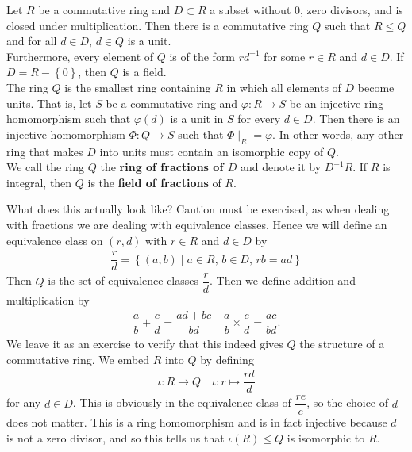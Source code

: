 \documentclass{memoir}
\begin{document}
\begin{thm}
	Let \(R\) be a commutative ring and \(D\subset R\) a subset without \(0\), zero divisors, and is closed under multiplication. Then there is a commutative ring \(Q\) such that \(R\leq Q\) and for all \(d \in D\), \(d \in Q\) is a unit.\\

	Furthermore, every element of \(Q\) is of the form \(rd^{-1}\) for some \(r \in R\) and \(d \in D\). If \(D = R - \left\{ 0 \right\} \), then \(Q\) is a field.\\

	The ring \(Q\) is the smallest ring containing \(R\) in which all elements of \(D\) become units. That is, let \(S\) be a commutative ring and \(\varphi :R\to S\) be an injective ring homomorphism such that \(\varphi (d)\) is a unit in \(S\) for every \(d \in D\). Then there is an injective homomorphism \(\Phi :Q\to S\) such that \(\Phi\mid_R = \varphi \). In other words, any other ring that makes \(D\) into units must contain an isomorphic copy of \(Q\).\\

	We call the ring \(Q\) the \textbf{ring of fractions of \(D\)} and denote it by \(D^{-1}R\). If \(R\) is integral, then \(Q\) is the \textbf{field of fractions} of \(R\).
\end{thm}
What does this actually look like? Caution must be exercised, as when dealing with fractions we are dealing with equivalence classes. Hence we will define an equivalence class on \((r,d)\) with \(r \in R\) and \(d \in D\) by
\begin{align*}
	\dfrac{r}{d} = \left\{(a,b) \mid a \in R,\, b \in D,\, rb = ad \right\} 
\end{align*}
Then \(Q\) is the set of equivalence classes \(\dfrac{r}{d}\). Then we define addition and multiplication by
\begin{align*}
	\dfrac{a}{b}+ \dfrac{c}{d}= \dfrac{ad+bc}{bd} \quad \dfrac{a}{b} \times \dfrac{c}{d} = \dfrac{ac}{bd}.
\end{align*}
We leave it as an exercise to verify that this indeed gives \(Q\) the structure of a commutative ring. We embed \(R\) into \(Q\) by defining
\begin{align*}
	\iota : R\to Q \quad \iota:r\mapsto \dfrac{rd}{d}
\end{align*}
for any \(d \in D\). This is obviously in the equivalence class of \(\dfrac{re}{e}\), so the choice of \(d\) does not matter. This is a ring homomorphism and is in fact injective because \(d\) is not a zero divisor, and so this tells us that \(\iota(R)\leq Q\) is isomorphic to \(R\).\\
\end{document}
